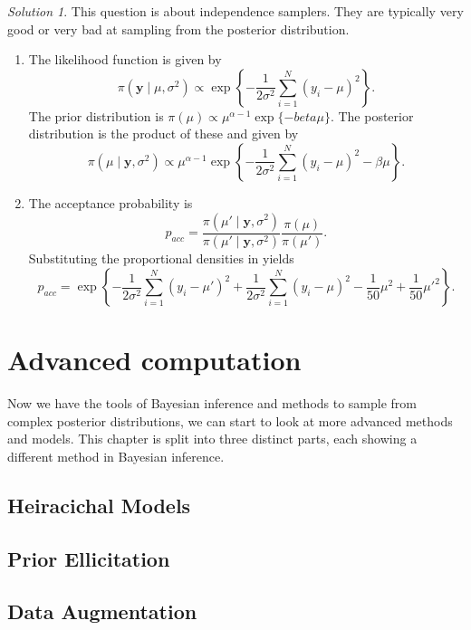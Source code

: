 \documentclass[
]{book}
\theoremstyle{definition}
\theoremstyle{definition}
\theoremstyle{definition}
\theoremstyle{definition}
\theoremstyle{remark}
\newtheorem*{solution}{Solution}
\begin{document}
\begin{solution}

This question is about independence samplers. They are typically very good or very bad at sampling from the posterior distribution.

\begin{enumerate}
\def\labelenumi{\arabic{enumi}.}
\item
  The likelihood function is given by
  \[
  \pi(\boldsymbol{y} \mid \mu, \sigma^2) \propto \exp\left\{-\frac{1}{2\sigma^2}\sum_{i=1}^N (y_i - \mu)^2 \right\}.
  \]
  The prior distribution is \(\pi(\mu) \propto \mu^{\alpha-1}\exp\{-beta\mu\}\). The posterior distribution is the product of these and given by
  \[
  \pi(\mu \mid \boldsymbol{y}, \sigma^2) \propto \mu^{\alpha-1} \exp\left\{-\frac{1}{2\sigma^2}\sum_{i=1}^N (y_i - \mu)^2  -
   \beta\mu\right\}.
  \]
\item
  The acceptance probability is
  \[
  p_{acc} = \frac{\pi(\mu'\mid \boldsymbol{y}, \sigma^2)}{\pi(\mu'\mid \boldsymbol{y}, \sigma^2)} \frac{\pi(\mu)}{\pi(\mu')}.
  \]
  Substituting the proportional densities in yields
  \[
  p_{acc} = \exp\left\{-\frac{1}{2\sigma^2}\sum_{i=1}^N (y_i - \mu')^2 + \frac{1}{2\sigma^2}\sum_{i=1}^N (y_i - \mu)^2 -\frac{1}{50}\mu^2 + \frac{1}{50}{\mu'}^2 \right\}.
  \]
\end{enumerate}

\end{solution}

\hypertarget{advanced-computation}{%
\chapter{Advanced computation}\label{advanced-computation}}

Now we have the tools of Bayesian inference and methods to sample from complex posterior distributions, we can start to look at more advanced methods and models. This chapter is split into three distinct parts, each showing a different method in Bayesian inference.

\hypertarget{heiracichal-models}{%
\section{Heiracichal Models}\label{heiracichal-models}}

\hypertarget{prior-ellicitation}{%
\section{Prior Ellicitation}\label{prior-ellicitation}}

\hypertarget{data-augmentation}{%
\section{Data Augmentation}\label{data-augmentation}}

  
\end{document}
